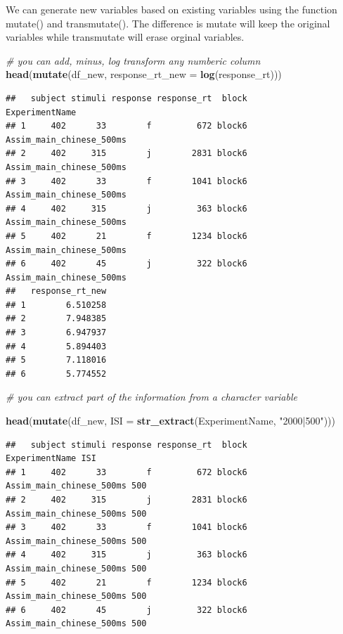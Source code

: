 \documentclass[]{book}
\newenvironment{Shaded}{\begin{snugshade}}{\end{snugshade}}
\newcommand{\KeywordTok}[1]{\textcolor[rgb]{0.13,0.29,0.53}{\textbf{#1}}}
\newcommand{\DataTypeTok}[1]{\textcolor[rgb]{0.13,0.29,0.53}{#1}}
\newcommand{\StringTok}[1]{\textcolor[rgb]{0.31,0.60,0.02}{#1}}
\newcommand{\CommentTok}[1]{\textcolor[rgb]{0.56,0.35,0.01}{\textit{#1}}}
\newcommand{\NormalTok}[1]{#1}
\begin{document}
We can generate new variables based on existing variables using the
function mutate() and transmutate(). The difference is mutate will keep
the original variables while transmutate will erase orginal variables.

\begin{Shaded}
\begin{Highlighting}[]
\CommentTok{# you can add, minus, log transform any numberic column}
\KeywordTok{head}\NormalTok{(}\KeywordTok{mutate}\NormalTok{(df_new, }\DataTypeTok{response_rt_new =} \KeywordTok{log}\NormalTok{(response_rt)))}
\end{Highlighting}
\end{Shaded}

\begin{verbatim}
##   subject stimuli response response_rt  block           ExperimentName
## 1     402      33        f         672 block6 Assim_main_chinese_500ms
## 2     402     315        j        2831 block6 Assim_main_chinese_500ms
## 3     402      33        f        1041 block6 Assim_main_chinese_500ms
## 4     402     315        j         363 block6 Assim_main_chinese_500ms
## 5     402      21        f        1234 block6 Assim_main_chinese_500ms
## 6     402      45        j         322 block6 Assim_main_chinese_500ms
##   response_rt_new
## 1        6.510258
## 2        7.948385
## 3        6.947937
## 4        5.894403
## 5        7.118016
## 6        5.774552
\end{verbatim}

\begin{Shaded}
\begin{Highlighting}[]
\CommentTok{# you can extract part of the information from a character variable}

\KeywordTok{head}\NormalTok{(}\KeywordTok{mutate}\NormalTok{(df_new, }\DataTypeTok{ISI =} \KeywordTok{str_extract}\NormalTok{(ExperimentName, }\StringTok{"2000|500"}\NormalTok{)))}
\end{Highlighting}
\end{Shaded}

\begin{verbatim}
##   subject stimuli response response_rt  block           ExperimentName ISI
## 1     402      33        f         672 block6 Assim_main_chinese_500ms 500
## 2     402     315        j        2831 block6 Assim_main_chinese_500ms 500
## 3     402      33        f        1041 block6 Assim_main_chinese_500ms 500
## 4     402     315        j         363 block6 Assim_main_chinese_500ms 500
## 5     402      21        f        1234 block6 Assim_main_chinese_500ms 500
## 6     402      45        j         322 block6 Assim_main_chinese_500ms 500
\end{verbatim}
\end{document}
